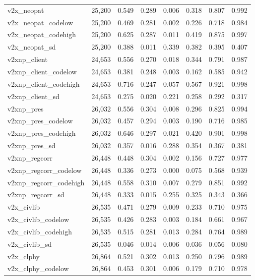 \begin{table}[!htbp]
\begin{tabular}{@{\extracolsep{5pt}}lccccccc}
v2x\_neopat & 25,200 & 0.549 & 0.289 & 0.006 & 0.318 & 0.807 & 0.992 \\ 
v2x\_neopat\_codelow & 25,200 & 0.469 & 0.281 & 0.002 & 0.226 & 0.718 & 0.984 \\ 
v2x\_neopat\_codehigh & 25,200 & 0.625 & 0.287 & 0.011 & 0.419 & 0.875 & 0.997 \\ 
v2x\_neopat\_sd & 25,200 & 0.388 & 0.011 & 0.339 & 0.382 & 0.395 & 0.407 \\ 
v2xnp\_client & 24,653 & 0.556 & 0.270 & 0.018 & 0.344 & 0.791 & 0.987 \\ 
v2xnp\_client\_codelow & 24,653 & 0.381 & 0.248 & 0.003 & 0.162 & 0.585 & 0.942 \\ 
v2xnp\_client\_codehigh & 24,653 & 0.716 & 0.247 & 0.057 & 0.567 & 0.921 & 0.998 \\ 
v2xnp\_client\_sd & 24,653 & 0.275 & 0.020 & 0.221 & 0.258 & 0.292 & 0.317 \\ 
v2xnp\_pres & 26,032 & 0.556 & 0.304 & 0.008 & 0.296 & 0.825 & 0.994 \\ 
v2xnp\_pres\_codelow & 26,032 & 0.457 & 0.294 & 0.003 & 0.190 & 0.716 & 0.985 \\ 
v2xnp\_pres\_codehigh & 26,032 & 0.646 & 0.297 & 0.021 & 0.420 & 0.901 & 0.998 \\ 
v2xnp\_pres\_sd & 26,032 & 0.357 & 0.016 & 0.288 & 0.354 & 0.367 & 0.381 \\ 
v2xnp\_regcorr & 26,448 & 0.448 & 0.304 & 0.002 & 0.156 & 0.727 & 0.977 \\ 
v2xnp\_regcorr\_codelow & 26,448 & 0.336 & 0.273 & 0.000 & 0.075 & 0.568 & 0.939 \\ 
v2xnp\_regcorr\_codehigh & 26,448 & 0.558 & 0.310 & 0.007 & 0.279 & 0.851 & 0.992 \\ 
v2xnp\_regcorr\_sd & 26,448 & 0.333 & 0.015 & 0.255 & 0.325 & 0.343 & 0.366 \\ 
v2x\_civlib & 26,535 & 0.471 & 0.279 & 0.009 & 0.233 & 0.710 & 0.975 \\ 
v2x\_civlib\_codelow & 26,535 & 0.426 & 0.283 & 0.003 & 0.184 & 0.661 & 0.967 \\ 
v2x\_civlib\_codehigh & 26,535 & 0.515 & 0.281 & 0.013 & 0.284 & 0.764 & 0.989 \\ 
v2x\_civlib\_sd & 26,535 & 0.046 & 0.014 & 0.006 & 0.036 & 0.056 & 0.080 \\ 
v2x\_clphy & 26,864 & 0.521 & 0.302 & 0.013 & 0.250 & 0.796 & 0.989 \\ 
v2x\_clphy\_codelow & 26,864 & 0.453 & 0.301 & 0.006 & 0.179 & 0.710 & 0.978 \\ 

\end{tabular}
\end{table}
